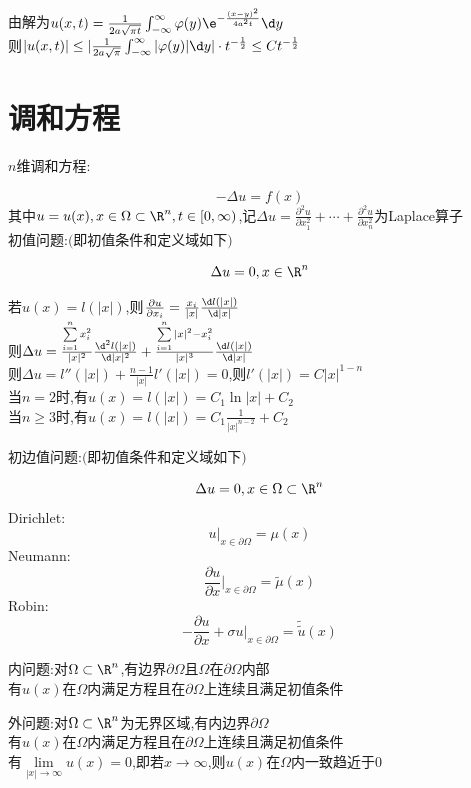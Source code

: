 \begin{jie}
由解为$u(x,t)=\frac{1}{2a\sqrt{\pi t}}\int_{-\infty}^{\infty}\varphi(y)\e^{-\frac{(x-y)^2}{4a^2t}}\d y$\\
则$|u(x,t)|\leq |\frac{1}{2a\sqrt{\pi}}\int_{-\infty}^{\infty}|\varphi(y)|\d y|\cdot t^{-\frac{1}{2}}\leq Ct^{-\frac{1}{2}}$
\end{jie}

\chapter{调和方程}

$n$维调和方程:

\[-\Delta u=f(x)\]
其中$u=u(x),x\in\Omega\subset\R^n,t\in [0,\infty)$,记$\Delta u=\frac{\partial^2u}{\partial x_1^2}+\cdots+\frac{\partial^2u}{\partial x_n^2}$为Laplace算子\\

初值问题:$($即初值条件和定义域如下$)$

\[\Delta u=0,x\in\R^n\]

\begin{jie}
若$u(x)=l(|x|)$,则$\frac{\partial u}{\partial x_i}=\frac{x_i}{|x|}\frac{\d l(|x|)}{\d |x|}$\\
则$\Delta u=\frac{\sum\limits_{i=1}^{n}x_i^2}{|x|^2}\frac{\d^2 l(|x|)}{\d |x|^2}+\frac{\sum\limits_{i=1}^{n}|x|^2-x_i^2}{|x|^3}\frac{\d l(|x|)}{\d |x|}$\\
则$\Delta u=l''(|x|)+\frac{n-1}{|x|}l'(|x|)=0$,则$l'(|x|)=C|x|^{1-n}$\\
当$n=2$时,有$u(x)=l(|x|)=C_1\ln|x|+C_2$\\
当$n\geq 3$时,有$u(x)=l(|x|)=C_1\frac{1}{|x|^{n-2}}+C_2$
\end{jie}

初边值问题:$($即初值条件和定义域如下$)$

\[\Delta u=0,x\in\Omega\subset\R^n\]
Dirichlet:
\[u|_{x\in\partial\Omega}=\mu(x)\] 
Neumann:
\[\frac{\partial u}{\partial x}|_{x\in\partial\Omega}=\widetilde{\mu}(x)\] 
Robin:
\[-\frac{\partial u}{\partial x}+\sigma u|_{x\in\partial\Omega}=\widetilde{\widetilde{u}}(x)\]

内问题:对$\Omega\subset \R^n$,有边界$\partial \Omega$且$\Omega$在$\partial \Omega$内部\\
有$u(x)$在$\Omega$内满足方程且在$\partial\Omega$上连续且满足初值条件

外问题:对$\Omega\subset \R^n$为无界区域,有内边界$\partial \Omega$\\
有$u(x)$在$\Omega$内满足方程且在$\partial\Omega$上连续且满足初值条件\\
有$\lim\limits_{|x|\to\infty}u(x)=0$,即若$x\to\infty$,则$u(x)$在$\Omega$内一致趋近于$0$

